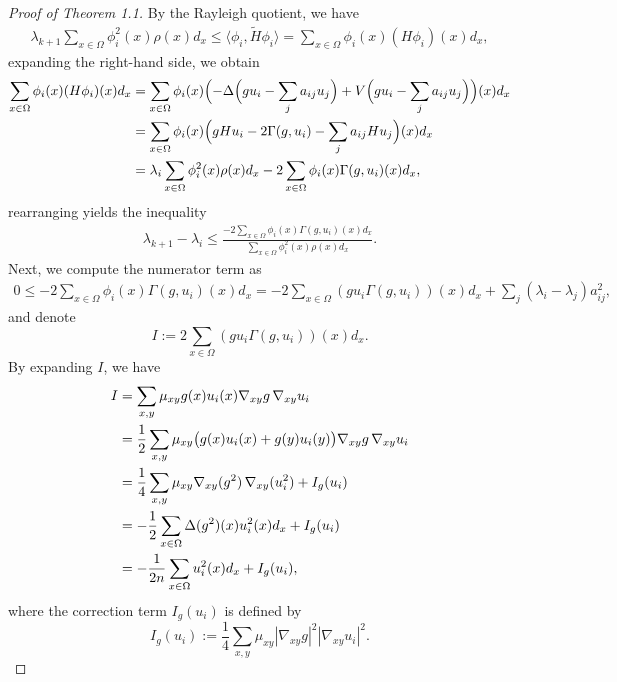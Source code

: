 \documentclass[11pt]{article}
\theoremstyle{definition}
\theoremstyle{remark}
\numberwithin{equation}{section}
\begin{document}
\begin{proof}[Proof of Theorem 1.1]
By the Rayleigh quotient, we have
\begin{align}
\lambda_{k+1} \sum_{x \in \Omega} \phi_i^2(x) \rho(x) d_x 
\leq \langle \phi_i, \widetilde{H} \phi_i \rangle 
= \sum_{x \in \Omega} \phi_i(x) (H \phi_i)(x) d_x,
\end{align}
\noindent
expanding the right-hand side, we obtain
\begin{align}
\sum_{x \in \Omega} \phi_i(x) (H \phi_i)(x) d_x 
&= \sum_{x \in \Omega} \phi_i(x) \Bigl(-\Delta \Bigl(g u_i - \sum_{j} a_{ij} u_j\Bigr) + V \Bigl(g u_i - \sum_{j} a_{ij} u_j\Bigr)\Bigr)(x) d_x \notag \\
&= \sum_{x \in \Omega} \phi_i(x) \Bigl( g H u_i - 2 \Gamma(g, u_i) - \sum_j a_{ij} H u_j \Bigr)(x) d_x \notag \\
&= \lambda_i \sum_{x \in \Omega} \phi_i^2(x) \rho(x) d_x - 2 \sum_{x \in \Omega} \phi_i(x) \Gamma(g, u_i)(x) d_x,
\end{align}
\noindent
rearranging yields the inequality
\begin{align}\label{eq:3.6}
\lambda_{k+1} - \lambda_i 
\leq \frac{-2 \sum_{x \in \Omega} \phi_i(x) \Gamma(g, u_i)(x) d_x}{\sum_{x \in \Omega} \phi_i^2(x) \rho(x) d_x}.
\end{align}
Next, we compute the numerator term as
\begin{align}
0 \le -2 \sum_{x \in \Omega} \phi_i(x) \Gamma(g, u_i)(x) d_x 
= -2 \sum_{x \in \Omega} (g u_i \Gamma(g, u_i))(x) d_x + \sum_j (\lambda_i - \lambda_j) a_{ij}^2,
\end{align}
and denote
\[
I := 2 \sum_{x \in \Omega} (g u_i \Gamma(g, u_i))(x) d_x.
\]
By expanding \( I \), we have
\begin{align}\label{eq:3.8}
I 
&= \sum_{x,y} \mu_{xy} g(x) u_i(x) \nabla_{xy} g \, \nabla_{xy} u_i \notag \\
&= \frac{1}{2} \sum_{x,y} \mu_{xy} \big( g(x) u_i(x) + g(y) u_i(y) \big) \nabla_{xy} g \, \nabla_{xy} u_i \notag \\
&= \frac{1}{4} \sum_{x,y} \mu_{xy} \nabla_{xy}(g^2) \, \nabla_{xy}(u_i^2) + I_g(u_i) \notag \\
&= -\frac{1}{2} \sum_{x \in \Omega} \Delta(g^2)(x) u_i^2(x) d_x + I_g(u_i) \notag \\
&= -\frac{1}{2n} \sum_{x \in \Omega} u_i^2(x) d_x + I_g(u_i),
\end{align}
where the correction term \( I_g(u_i) \) is defined by
\[
I_g(u_i) := \frac{1}{4} \sum_{x,y} \mu_{xy} |\nabla_{xy} g|^2 |\nabla_{xy} u_i|^2.
\]
\end{proof}
\end{document}
